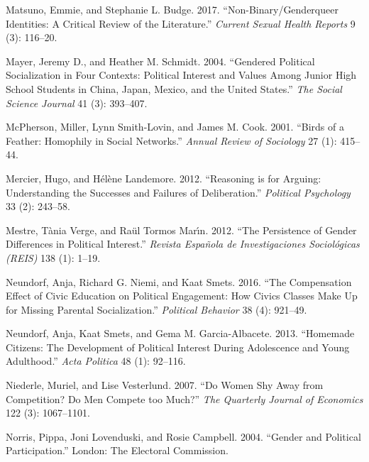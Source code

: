 \documentclass[
  letterpaper,
  DIV=11,
  numbers=noendperiod]{scrreprt}
\newlength{\cslhangindent}
\newlength{\cslentryspacingunit} %
\newenvironment{CSLReferences}[2] %
 {%
  \setlength{\parindent}{0pt}
  \ifodd #1
  \let\oldpar\par
  \def\par{\hangindent=\cslhangindent\oldpar}
  \fi
  \setlength{\parskip}{#2\cslentryspacingunit}
 }%
 {}
\begin{document}
\begin{CSLReferences}{1}{0}
\leavevmode{}%
Matsuno, Emmie, and Stephanie L. Budge. 2017. {``{Non-Binary/Genderqueer
Identities: A Critical Review of the Literature}.''} \emph{Current
Sexual Health Reports} 9 (3): 116--20.

\leavevmode{}%
Mayer, Jeremy D., and Heather M. Schmidt. 2004. {``{Gendered Political
Socialization in Four Contexts: Political Interest and Values Among
Junior High School Students in China, Japan, Mexico, and the United
States}.''} \emph{The Social Science Journal} 41 (3): 393--407.

\leavevmode{}%
McPherson, Miller, Lynn Smith-Lovin, and James M. Cook. 2001. {``{Birds
of a Feather: Homophily in Social Networks}.''} \emph{Annual Review of
Sociology} 27 (1): 415--44.

\leavevmode{}%
Mercier, Hugo, and Hélène Landemore. 2012. {``{Reasoning is for Arguing:
Understanding the Successes and Failures of Deliberation}.''}
\emph{Political Psychology} 33 (2): 243--58.

\leavevmode{}%
Mestre, Tània Verge, and Raül Tormos Marı́n. 2012. {``{The Persistence of
Gender Differences in Political Interest}.''} \emph{Revista Espa{ñ}ola
de Investigaciones Sociol{ó}gicas (REIS)} 138 (1): 1--19.

\leavevmode{}%
Neundorf, Anja, Richard G. Niemi, and Kaat Smets. 2016. {``{The
Compensation Effect of Civic Education on Political Engagement: How
Civics Classes Make Up for Missing Parental Socialization}.''}
\emph{Political Behavior} 38 (4): 921--49.

\leavevmode{}%
Neundorf, Anja, Kaat Smets, and Gema M. Garcia-Albacete. 2013.
{``{Homemade Citizens: The Development of Political Interest During
Adolescence and Young Adulthood}.''} \emph{Acta Politica} 48 (1):
92--116.

\leavevmode{}%
Niederle, Muriel, and Lise Vesterlund. 2007. {``{Do Women Shy Away from
Competition? Do Men Compete too Much?}''} \emph{The Quarterly Journal of
Economics} 122 (3): 1067--1101.

\leavevmode{}%
Norris, Pippa, Joni Lovenduski, and Rosie Campbell. 2004. {``{Gender and
Political Participation}.''} London: The Electoral Commission.


\end{CSLReferences}
\end{document}

